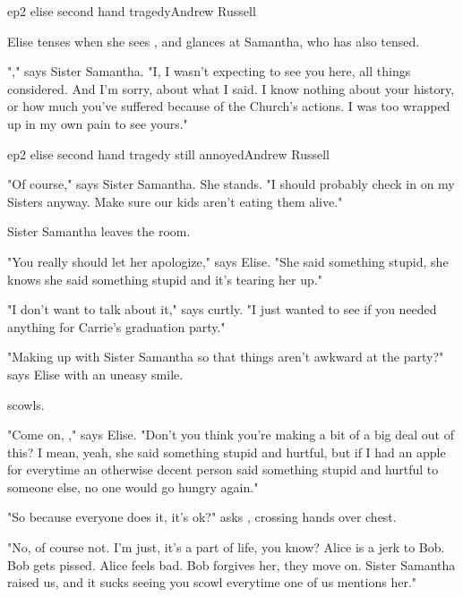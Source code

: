 \documentclass{book}
\begin{document}
\begin{childnode}{ep2 elise second hand tragedy}{Andrew Russell}

    Elise tenses when she sees \name{}, and glances at Samantha, who has also tensed.

    "\name{}," says Sister Samantha. "I, I wasn't expecting to see you here, all things considered. And I'm sorry, about what I said. I know nothing about your history, or how much you've suffered because of the Church's actions. I was too wrapped up in my own pain to 
    see yours."



\end{childnode}

\begin{childnode}{ep2 elise second hand tragedy still annoyed}{Andrew Russell}

    "Of course," says Sister Samantha. She stands. "I should probably check in on my Sisters anyway. Make sure our kids aren't eating them alive."

    Sister Samantha leaves the room.

    "You really should let her apologize," says Elise. "She said something stupid, she knows she said something stupid and it's tearing her up."

    "I don't want to talk about it," says \name{} curtly. "I just wanted to see if you needed anything for Carrie's graduation party."

    "Making up with Sister Samantha so that things aren't awkward at the party?" says Elise with an uneasy smile.

    \name{} scowls.

    "Come on, \nickname{}," says Elise. "Don't you think you're making a bit of a big deal out of this? I mean, yeah, she said something stupid and hurtful, but if I had an apple for everytime an otherwise decent person said something stupid and hurtful to someone 
    else, no one would go hungry again."

    "So because everyone does it, it's ok?" asks \name{}, crossing \hisher{} hands over \hisher{} chest.

    "No, of course not. I'm just, it's a part of life, you know? Alice is a jerk to Bob. Bob gets pissed. Alice feels bad. Bob forgives her, they move on. Sister Samantha raised us, and it sucks 
    seeing you scowl everytime one of us mentions her."



\end{childnode}
\end{document}
